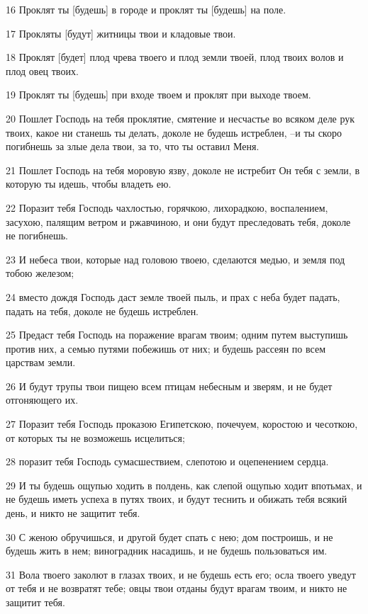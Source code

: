 \par 16 Проклят ты [будешь] в городе и проклят ты [будешь] на поле.
\par 17 Прокляты [будут] житницы твои и кладовые твои.
\par 18 Проклят [будет] плод чрева твоего и плод земли твоей, плод твоих волов и плод овец твоих.
\par 19 Проклят ты [будешь] при входе твоем и проклят при выходе твоем.
\par 20 Пошлет Господь на тебя проклятие, смятение и несчастье во всяком деле рук твоих, какое ни станешь ты делать, доколе не будешь истреблен, --и ты скоро погибнешь за злые дела твои, за то, что ты оставил Меня.
\par 21 Пошлет Господь на тебя моровую язву, доколе не истребит Он тебя с земли, в которую ты идешь, чтобы владеть ею.
\par 22 Поразит тебя Господь чахлостью, горячкою, лихорадкою, воспалением, засухою, палящим ветром и ржавчиною, и они будут преследовать тебя, доколе не погибнешь.
\par 23 И небеса твои, которые над головою твоею, сделаются медью, и земля под тобою железом;
\par 24 вместо дождя Господь даст земле твоей пыль, и прах с неба будет падать, падать на тебя, доколе не будешь истреблен.
\par 25 Предаст тебя Господь на поражение врагам твоим; одним путем выступишь против них, а семью путями побежишь от них; и будешь рассеян по всем царствам земли.
\par 26 И будут трупы твои пищею всем птицам небесным и зверям, и не будет отгоняющего их.
\par 27 Поразит тебя Господь проказою Египетскою, почечуем, коростою и чесоткою, от которых ты не возможешь исцелиться;
\par 28 поразит тебя Господь сумасшествием, слепотою и оцепенением сердца.
\par 29 И ты будешь ощупью ходить в полдень, как слепой ощупью ходит впотьмах, и не будешь иметь успеха в путях твоих, и будут теснить и обижать тебя всякий день, и никто не защитит тебя.
\par 30 С женою обручишься, и другой будет спать с нею; дом построишь, и не будешь жить в нем; виноградник насадишь, и не будешь пользоваться им.
\par 31 Вола твоего заколют в глазах твоих, и не будешь есть его; осла твоего уведут от тебя и не возвратят тебе; овцы твои отданы будут врагам твоим, и никто не защитит тебя.
